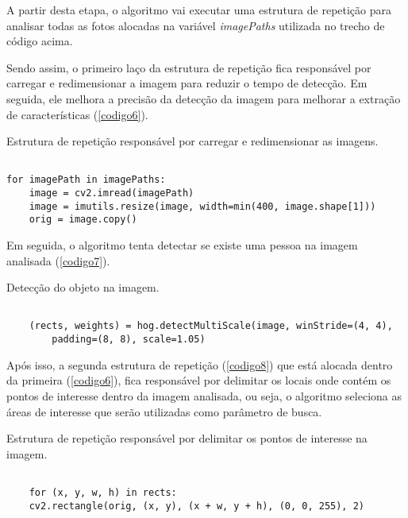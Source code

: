 A partir desta etapa, o algoritmo vai executar uma estrutura de repetição para analisar todas as fotos alocadas na variável \textit{imagePaths} utilizada no trecho de código acima.

Sendo assim, o primeiro laço da estrutura de repetição fica responsável por carregar e redimensionar a imagem para reduzir o tempo de detecção. Em seguida, ele melhora a precisão da detecção da imagem para melhorar a extração de características (\autoref{codigo6}).

\begin{listing}[ht]
\caption{\label{codigo6}Estrutura de repetição responsável por carregar e redimensionar as imagens.}
\begin{verbatim}

for imagePath in imagePaths:
	image = cv2.imread(imagePath)
	image = imutils.resize(image, width=min(400, image.shape[1]))
	orig = image.copy()

\end{verbatim}
\end{listing}

Em seguida, o algoritmo tenta detectar se existe uma pessoa na imagem analisada (\autoref{codigo7}).

\begin{listing}[ht]
\caption{\label{codigo7}Detecção do objeto na imagem.}
\begin{verbatim}

    (rects, weights) = hog.detectMultiScale(image, winStride=(4, 4),
        padding=(8, 8), scale=1.05)

\end{verbatim}
\end{listing}

Após isso, a segunda estrutura de repetição (\autoref{codigo8}) que está alocada dentro da primeira (\autoref{codigo6}), fica responsável por delimitar os locais onde contém os pontos de interesse dentro da imagem analisada, ou seja, o algoritmo seleciona as áreas de interesse que serão utilizadas como parâmetro de busca.

\begin{listing}[ht]
\caption{\label{codigo8}Estrutura de repetição responsável por delimitar os pontos de interesse na imagem.}
\begin{verbatim}

    for (x, y, w, h) in rects:
	cv2.rectangle(orig, (x, y), (x + w, y + h), (0, 0, 255), 2)

\end{verbatim}
\end{listing}


